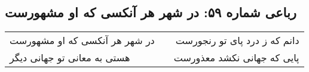 \begin{center}
\section*{رباعی شماره ۵۹: در شهر هر آنکسی که او مشهورست}
\label{sec:sh059}
\begin{longtable}{l p{0.5cm} r}
در شهر هر آنکسی که او مشهورست
&&
دانم که ز درد پای تو رنجورست
\\
هستی به معانی تو جهانی دیگر
&&
پایی که جهانی نکشد معذورست
\\
\end{longtable}
\end{center}

